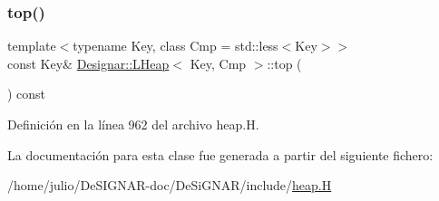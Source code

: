 \subsubsection{\texorpdfstring{top()}{top()}}
{\footnotesize\ttfamily template$<$typename Key, class Cmp = std\+::less$<$\+Key$>$$>$ \\
const Key\& \hyperlink{class_designar_1_1_l_heap}{Designar\+::\+L\+Heap}$<$ Key, Cmp $>$\+::top (\begin{DoxyParamCaption}{ }\end{DoxyParamCaption}) const\hspace{0.3cm}{\ttfamily [inline]}}



Definición en la línea 962 del archivo heap.\+H.



La documentación para esta clase fue generada a partir del siguiente fichero\+:\begin{DoxyCompactItemize}
\item 
/home/julio/\+De\+S\+I\+G\+N\+A\+R-\/doc/\+De\+Si\+G\+N\+A\+R/include/\hyperlink{heap_8_h}{heap.\+H}\end{DoxyCompactItemize}
